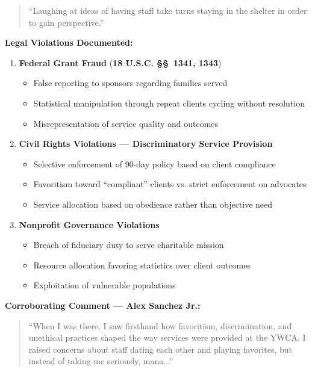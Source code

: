 \documentclass[11pt,letterpaper]{article}
\newcommand{\statref}[1]{\textbf{\color{NavyBlue}#1}}
\newenvironment{testimony}{%
    \begin{quote}\itshape\color{DarkGray}%
}{%
    \end{quote}%
}
\begin{document}
\begin{testimony}
``Laughing at ideas of having staff take turns staying in the shelter in order to gain perspective.''
\end{testimony}

\textbf{Legal Violations Documented:}

\begin{enumerate}[leftmargin=*]
\item \textbf{Federal Grant Fraud} (\statref{18 U.S.C. \S\S~1341, 1343})
\begin{itemize}
\item False reporting to sponsors regarding families served
\item Statistical manipulation through repeat clients cycling without resolution
\item Misrepresentation of service quality and outcomes
\end{itemize}

\item \textbf{Civil Rights Violations --- Discriminatory Service Provision}
\begin{itemize}
\item Selective enforcement of 90-day policy based on client compliance
\item Favoritism toward ``compliant'' clients vs. strict enforcement on advocates
\item Service allocation based on obedience rather than objective need
\end{itemize}

\item \textbf{Nonprofit Governance Violations}
\begin{itemize}
\item Breach of fiduciary duty to serve charitable mission
\item Resource allocation favoring statistics over client outcomes
\item Exploitation of vulnerable populations
\end{itemize}
\end{enumerate}

\textbf{Corroborating Comment --- Alex Sanchez Jr.:}
\begin{testimony}
``When I was there, I saw firsthand how favoritism, discrimination, and unethical practices shaped the way services were provided at the YWCA. I raised concerns about staff dating each other and playing favorites, but instead of taking me seriously, mana...''
\end{testimony}
\end{document}
